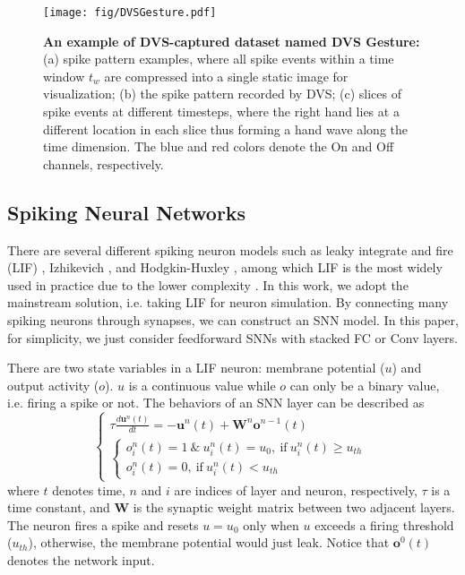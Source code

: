 \documentclass[journal,10pt,twocolumn]{IEEETran}
\begin{document}
\begin{figure}[!htbp]
\centering     
\texttt{[image: fig/DVSGesture.pdf]}
\caption{\textbf{An example of DVS-captured dataset named DVS Gesture:} (a) spike pattern examples, where all spike events within a time window $t_{w}$ are compressed into a single static image for visualization; (b) the spike pattern recorded by DVS; (c) slices of spike events at different timesteps, where the right hand lies at a different location in each slice thus forming a hand wave along the time dimension. The blue and red colors denote the On and Off channels, respectively.} \label{fig:DVSGesture} 
\end{figure}

\subsection{Spiking Neural Networks}

There are several different spiking neuron models such as leaky integrate and fire (LIF) \cite{abbott1999lapicque}, Izhikevich \cite{izhikevich2003simple}, and Hodgkin-Huxley \cite{hodgkin1952quantitative}, among which LIF is the most widely used in practice due to the lower complexity \cite{izhikevich2004model}. In this work, we adopt the mainstream solution, i.e. taking LIF for neuron simulation. By connecting many spiking neurons through synapses, we can construct an SNN model. In this paper, for simplicity, we just consider feedforward SNNs with stacked FC or Conv layers.

There are two state variables in a LIF neuron: membrane potential ($u$) and output activity ($o$). $u$ is a continuous value while $o$ can only be a binary value, i.e. firing a spike or not. The behaviors of an SNN layer can be described as
\begin{equation}
    \label{equ:SNN_layer_1}
    \begin{cases}
\tau \frac{d\pmb{u}^{n}(t)}{dt} = -\pmb{u}^{n}(t) + \pmb{W}^{n}\pmb{o}^{n-1}(t)\\
\begin{cases}
o_i^{n}(t)=1~\&~u_i^{n}(t)=u_0,~\text{if}~u_i^{n}(t)\geq u_{th}\\
o_i^{n}(t)=0,~\text{if}~u_i^{n}(t)< u_{th}~
\end{cases}
\end{cases}
\end{equation}
where $t$ denotes time, $n$ and $i$ are indices of layer and neuron, respectively, $\tau$ is a time constant, and $\pmb{W}$ is the synaptic weight matrix between two adjacent layers. The neuron fires a spike and resets $u=u_0$ only when $u$ exceeds a firing threshold ($u_{th}$), otherwise, the membrane potential would just leak. Notice that $\pmb{o}^{0}(t)$ denotes the network input.
\end{document}
